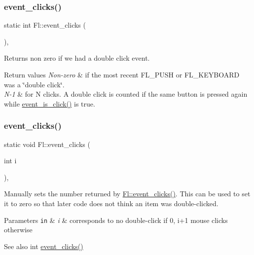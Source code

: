\subsubsection{\texorpdfstring{event\+\_\+clicks()}{event\_clicks()}\hspace{0.1cm}{\footnotesize\ttfamily [1/2]}}
{\footnotesize\ttfamily static int Fl\+::event\+\_\+clicks (\begin{DoxyParamCaption}{ }\end{DoxyParamCaption})\hspace{0.3cm}{\ttfamily [inline]}, {\ttfamily [static]}}

Returns non zero if we had a double click event. 
\begin{DoxyRetVals}{Return values}
{\em Non-\/zero} & if the most recent F\+L\+\_\+\+P\+U\+SH or F\+L\+\_\+\+K\+E\+Y\+B\+O\+A\+RD was a \char`\"{}double click\char`\"{}. \\
\hline
{\em N-\/1} & for N clicks. A double click is counted if the same button is pressed again while \hyperlink{group__fl__events_gae4f3bafeb9fbae98c3b7cc6f5326e582}{event\+\_\+is\+\_\+click()} is true. \\
\hline
\end{DoxyRetVals}
\mbox{\label{group__fl__events_ga0531622eb47fab712faedd43eab886d9}} 
\subsubsection{\texorpdfstring{event\+\_\+clicks()}{event\_clicks()}\hspace{0.1cm}{\footnotesize\ttfamily [2/2]}}
{\footnotesize\ttfamily static void Fl\+::event\+\_\+clicks (\begin{DoxyParamCaption}\item[{int}]{i }\end{DoxyParamCaption})\hspace{0.3cm}{\ttfamily [inline]}, {\ttfamily [static]}}

Manually sets the number returned by \hyperlink{group__fl__events_gafa31b53b34bd43ee107806a3bbc640d1}{Fl\+::event\+\_\+clicks()}. This can be used to set it to zero so that later code does not think an item was double-\/clicked. 
\begin{DoxyParams}[1]{Parameters}
\mbox{\tt in}  & {\em i} & corresponds to no double-\/click if 0, i+1 mouse clicks otherwise \\
\hline
\end{DoxyParams}
\begin{DoxySeeAlso}{See also}
int \hyperlink{group__fl__events_gafa31b53b34bd43ee107806a3bbc640d1}{event\+\_\+clicks()} 
\end{DoxySeeAlso}
\mbox{\label{group__fl__events_ga5964867d1d60792c45bb28082c257624}} 
